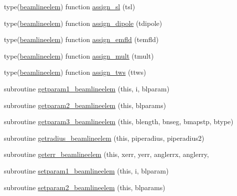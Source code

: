 \begin{DoxyCompactItemize}
\item 
type(\mbox{\hyperlink{namespacebeamlineelemclass_structbeamlineelemclass_1_1beamlineelem}{beamlineelem}}) function \mbox{\hyperlink{namespacebeamlineelemclass_ad06dd33f09db1eab5304ec2a865a4b83}{assign\+\_\+sl}} (tsl)
\item 
type(\mbox{\hyperlink{namespacebeamlineelemclass_structbeamlineelemclass_1_1beamlineelem}{beamlineelem}}) function \mbox{\hyperlink{namespacebeamlineelemclass_ab472ce183e8b1faa6f40c494a9d8bc03}{assign\+\_\+dipole}} (tdipole)
\item 
type(\mbox{\hyperlink{namespacebeamlineelemclass_structbeamlineelemclass_1_1beamlineelem}{beamlineelem}}) function \mbox{\hyperlink{namespacebeamlineelemclass_ac9cc1a9326b192530803d06d2e8b088b}{assign\+\_\+emfld}} (temfld)
\item 
type(\mbox{\hyperlink{namespacebeamlineelemclass_structbeamlineelemclass_1_1beamlineelem}{beamlineelem}}) function \mbox{\hyperlink{namespacebeamlineelemclass_aacf4de73999b66f3e37bf58cda6e562b}{assign\+\_\+mult}} (tmult)
\item 
type(\mbox{\hyperlink{namespacebeamlineelemclass_structbeamlineelemclass_1_1beamlineelem}{beamlineelem}}) function \mbox{\hyperlink{namespacebeamlineelemclass_a097831d1513c1bbd70e5f97dea56fcd4}{assign\+\_\+tws}} (ttws)
\item 
subroutine \mbox{\hyperlink{namespacebeamlineelemclass_a52595a459a442685b5ab427a2fdb27c8}{getparam1\+\_\+beamlineelem}} (this, i, blparam)
\item 
subroutine \mbox{\hyperlink{namespacebeamlineelemclass_ab0803e0260eb5f57a59a7d1f70cf7050}{getparam2\+\_\+beamlineelem}} (this, blparams)
\item 
subroutine \mbox{\hyperlink{namespacebeamlineelemclass_a0b69da010861c6ca72da3822335a7b2f}{getparam3\+\_\+beamlineelem}} (this, blength, bnseg, bmapstp, btype)
\item 
subroutine \mbox{\hyperlink{namespacebeamlineelemclass_aa3e3f73b38a31d67a955712c9706a2bd}{getradius\+\_\+beamlineelem}} (this, piperadius, piperadius2)
\item 
subroutine \mbox{\hyperlink{namespacebeamlineelemclass_aa02696ccb3d6d48bfdcb0ff3ea906fa1}{geterr\+\_\+beamlineelem}} (this, xerr, yerr, anglerrx, anglerry,
\item 
subroutine \mbox{\hyperlink{namespacebeamlineelemclass_a2475c641494686c9c9688a8b15975cbf}{setparam1\+\_\+beamlineelem}} (this, i, blparam)
\item 
subroutine \mbox{\hyperlink{namespacebeamlineelemclass_a2ac6f016596ac46cf326e023cbb3f23b}{setparam2\+\_\+beamlineelem}} (this, blparams)

\end{DoxyCompactItemize}

